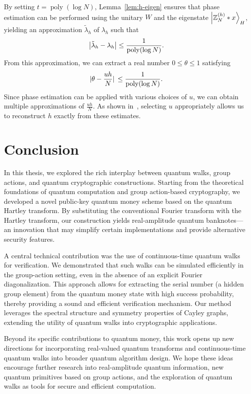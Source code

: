 \documentclass[12pt]{report}
\begin{document}
    By setting \( t = \operatorname{poly}(\log N) \), Lemma~\ref{lem:h-eigen} ensures that phase estimation can be performed using the unitary \( W \) and the eigenstate \( \ket{\mathbb{Z}_N^{(h)} * x}_H \), yielding an approximation \( \tilde{\lambda}_h \) of \( \lambda_h \) such that
    \[
    \abs{\tilde{\lambda}_h - \lambda_h} \le \frac{1}{\operatorname{poly}(\log N)}.
    \]
    From this approximation, we can extract a real number \( 0 \le \theta \le 1 \) satisfying
    \[
    \abs*{\theta - \frac{uh}{N}} \le \frac{1}{\operatorname{poly}(\log N)}.
    \]
    Since phase estimation can be applied with various choices of \( u \), we can obtain multiple approximations of \( \frac{uh}{N} \). As shown in~\cite{Zhandry2024}, selecting \( u \) appropriately allows us to reconstruct \( h \) exactly from these estimates.




    

\chapter*{Conclusion}

In this thesis, we explored the rich interplay between quantum walks, group actions, and quantum cryptographic constructions. Starting from the theoretical foundations of quantum computation and group action-based cryptography, we developed a novel public-key quantum money scheme based on the quantum Hartley transform. By substituting the conventional Fourier transform with the Hartley transform, our construction yields real-amplitude quantum banknotes—an innovation that may simplify certain implementations and provide alternative security features.

A central technical contribution was the use of continuous-time quantum walks for verification. We demonstrated that such walks can be simulated efficiently in the group-action setting, even in the absence of an explicit Fourier diagonalization. This approach allows for extracting the serial number (a hidden group element) from the quantum money state with high success probability, thereby providing a sound and efficient verification mechanism. Our method leverages the spectral structure and symmetry properties of Cayley graphs, extending the utility of quantum walks into cryptographic applications.

Beyond its specific contributions to quantum money, this work opens up new directions for incorporating real-valued quantum transforms and continuous-time quantum walks into broader quantum algorithm design. We hope these ideas encourage further research into real-amplitude quantum information, new quantum primitives based on group actions, and the exploration of quantum walks as tools for secure and efficient computation.
\end{document}
